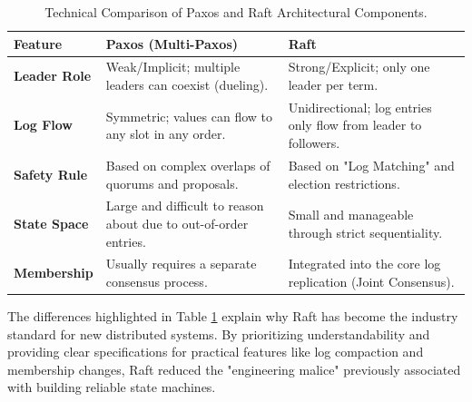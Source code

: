 \begin{table}[h]
\centering
\caption{Technical Comparison of Paxos and Raft Architectural Components.}
\label{tab:paxos_raft_comparison}
\begin{tabular}{|p{3cm}|p{5cm}|p{5cm}|}
\hline
\textbf{Feature} & \textbf{Paxos (Multi-Paxos)} & \textbf{Raft} \\ \hline
\textbf{Leader Role} & Weak/Implicit; multiple leaders can coexist (dueling). & Strong/Explicit; only one leader per term. \\ \hline
\textbf{Log Flow} & Symmetric; values can flow to any slot in any order. & Unidirectional; log entries only flow from leader to followers. \\ \hline
\textbf{Safety Rule} & Based on complex overlaps of quorums and proposals. & Based on "Log Matching" and election restrictions. \\ \hline
\textbf{State Space} & Large and difficult to reason about due to out-of-order entries. & Small and manageable through strict sequentiality. \\ \hline
\textbf{Membership} & Usually requires a separate consensus process. & Integrated into the core log replication (Joint Consensus). \\ \hline
\end{tabular}
\end{table}

The differences highlighted in Table \ref{tab:paxos_raft_comparison} explain why Raft has become the industry standard for new distributed systems. By prioritizing understandability and providing clear specifications for practical features like log compaction and membership changes, Raft reduced the "engineering malice" previously associated with building reliable state machines.